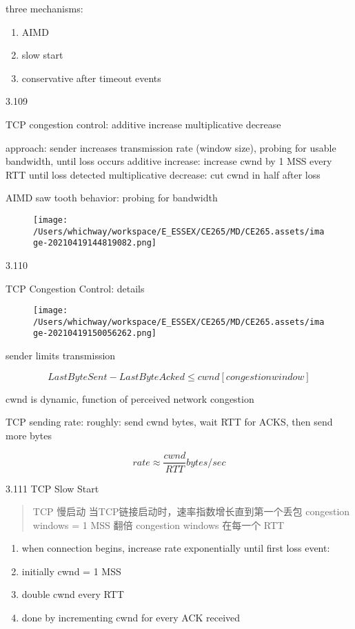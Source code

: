 \documentclass[
]{article}
\begin{document}
three mechanisms:

\begin{enumerate}
\def\labelenumi{\arabic{enumi}.}
\item
  AIMD
\item
  slow start
\item
  conservative after timeout events
\end{enumerate}

3.109

TCP congestion control: additive increase multiplicative decrease

approach: sender increases transmission rate (window size), probing for
usable bandwidth, until loss occurs additive increase: increase cwnd by
1 MSS every RTT until loss detected multiplicative decrease: cut cwnd in
half after loss

AIMD saw tooth behavior: probing for bandwidth

\begin{figure}
\centering
\texttt{[image: /Users/whichway/workspace/E\_ESSEX/CE265/MD/CE265.assets/image-20210419144819082.png]}
\caption{}
\end{figure}

3.110

TCP Congestion Control: details

\begin{figure}
\centering
\texttt{[image: /Users/whichway/workspace/E\_ESSEX/CE265/MD/CE265.assets/image-20210419150056262.png]}
\caption{}
\end{figure}

sender limits transmission

\[LastByteSent - LastByteAcked \leq cwnd[congestion window]\]

cwnd is dynamic, function of perceived network congestion

TCP sending rate: roughly: send cwnd bytes, wait RTT for ACKS, then send
more bytes

\[rate \approx \frac{cwnd}{RTT} bytes/sec\]

3.111 TCP Slow Start

\begin{quote}
TCP 慢启动 当TCP链接启动时，速率指数增长直到第一个丢包 congestion
windows = 1 MSS 翻倍 congestion windows 在每一个 RTT
\end{quote}

\begin{enumerate}
\def\labelenumi{\arabic{enumi}.}
\item
  when connection begins, increase rate exponentially until first loss
  event:
\item
  initially cwnd = 1 MSS
\item
  double cwnd every RTT
\item
  done by incrementing cwnd for every ACK received
\end{enumerate}
\end{document}
